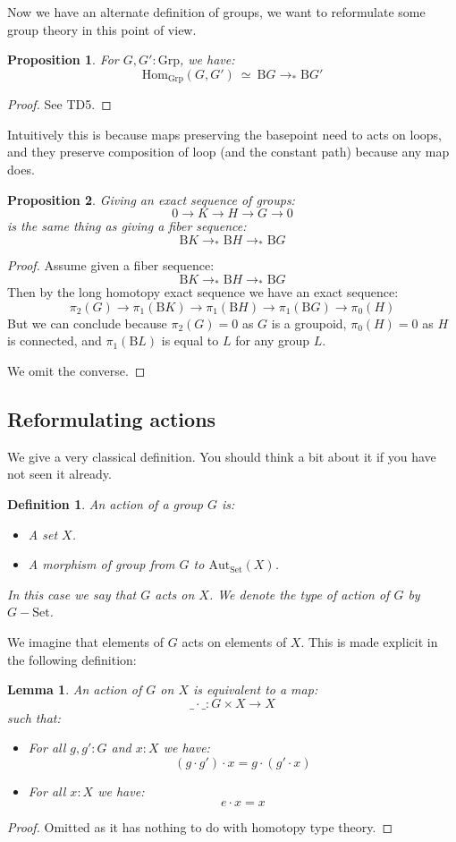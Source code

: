 \documentclass{article}
\newcommand{\sse}[1]{\medbreak \subsection{#1}}
\renewcommand{\r}{\rightarrow}
\newcommand{\Grp}{\mathrm{Grp}}
\newcommand{\Hom}{\mathrm{Hom}}
\newcommand{\B}{\mathrm{B}}
\newcommand{\Aut}{\mathrm{Aut}}
\newcommand{\Set}{\mathrm{Set}}
\newtheorem{lemma}{Lemma}
\newtheorem{definition}{Definition}
\newtheorem{proposition}{Proposition}
\begin{document}
Now we have an alternate definition of groups, we want to reformulate some group theory in this point of view.

\begin{proposition}
For $G,G':\Grp$, we have:
\[\Hom_\Grp(G,G') \ \simeq \ \B G\r_* \B G'\]
\end{proposition}
\begin{proof}
See TD5.
\end{proof}

Intuitively this is because maps preserving the basepoint need to acts on loops, and they preserve composition of loop (and the constant path) because any map does.

\begin{proposition}
Giving an exact sequence of groups:
\[0\r K \r H\r  G\r 0 \]
is the same thing as giving a fiber sequence:
\[\B K \r_*\B H\r_*\B G\]
\end{proposition}
\begin{proof}
Assume given a fiber sequence:
\[\B K \r_*\B H\r_*\B G\]
Then by the long homotopy exact sequence we have an exact sequence:
\[\pi_2(G)\r \pi_1(\B K) \r \pi_1(\B H) \r \pi_1(\B G) \r \pi_0(H)\]
But we can conclude because $\pi_2(G) = 0$ as $G$ is a groupoid, $\pi_0(H) = 0$ as $H$ is connected, and $\pi_1(\B L)$ is equal to $L$ for any group $L$.
 
We omit the converse.
\end{proof}



\sse{Reformulating actions}

We give a very classical definition. You should think a bit about it if you have not seen it already.

\begin{definition}
An action of a group $G$ is:
\begin{itemize}
\item A set $X$.
\item A morphism of group from $G$ to $\Aut_\Set(X)$.
\end{itemize}
In this case we say that $G$ acts on $X$. We denote the type of action of $G$ by $G-\Set$.
\end{definition}

We imagine that elements of $G$ acts on elements of $X$. This is made explicit in the following definition:

\begin{lemma}
An action of $G$ on $X$ is equivalent to a map:
\[\_\cdot\_ : G\times X \r X\]
such that:
\begin{itemize}
\item For all $g,g':G$ and $x:X$ we have:
\[(g\cdot g')\cdot x = g\cdot (g'\cdot x)\]
\item For all $x:X$ we have:
\[e\cdot x = x\]
\end{itemize} 
\end{lemma}
\begin{proof}
Omitted as it has nothing to do with homotopy type theory.
\end{proof}
\end{document}
